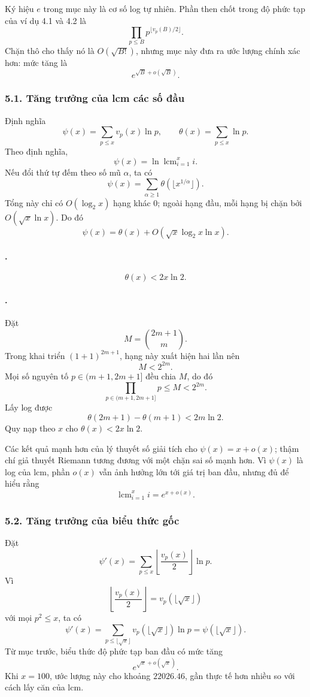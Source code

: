 \documentclass[11pt]{article}
\begin{document}
Ký hiệu \(e\) trong mục này là cơ số log tự nhiên. Phần then chốt trong độ phức
tạp của ví dụ 4.1 và 4.2 là
\[
  \prod_{p\le B}p^{\lfloor v_p(B)/2\rfloor}.
\]
Chặn thô cho thấy nó là \(O(\sqrt{B!})\), nhưng mục này đưa ra ước lượng chính
xác hơn: mức tăng là
\[
  e^{\sqrt B+o(\sqrt B)}.
\]

\subsubsection*{5.1. Tăng trưởng của lcm các số đầu}

Định nghĩa
\[
  \psi(x)=\sum_{p\le x}v_p(x)\ln p,\qquad
  \theta(x)=\sum_{p\le x}\ln p.
\]
Theo định nghĩa,
\[
  \psi(x)=\ln \operatorname{lcm}_{i=1}^{x}i.
\]
Nếu đổi thứ tự đếm theo số mũ \(\alpha\), ta có
\[
  \psi(x)=\sum_{\alpha\ge 1}\theta(\lfloor x^{1/\alpha}\rfloor).
\]
Tổng này chỉ có \(O(\log_2 x)\) hạng khác \(0\); ngoài hạng đầu, mỗi hạng bị
chặn bởi \(O(\sqrt x\ln x)\). Do đó
\[
  \psi(x)=\theta(x)+O(\sqrt x\log_2 x\ln x).
\]

\paragraph{.}
\[
  \theta(x)<2x\ln 2.
\]

\paragraph{.}
Đặt
\[
  M=\binom{2m+1}{m}.
\]
Trong khai triển \((1+1)^{2m+1}\), hạng này xuất hiện hai lần nên
\[
  M<2^{2m}.
\]
Mọi số nguyên tố \(p\in(m+1,2m+1]\) đều chia \(M\), do đó
\[
  \prod_{p\in(m+1,2m+1]}p\le M<2^{2m}.
\]
Lấy log được
\[
  \theta(2m+1)-\theta(m+1)<2m\ln 2.
\]
Quy nạp theo \(x\) cho \(\theta(x)<2x\ln 2\).

Các kết quả mạnh hơn của lý thuyết số giải tích cho
\(\psi(x)=x+o(x)\); thậm chí giả thuyết Riemann tương đương với một chặn sai
số mạnh hơn. Vì \(\psi(x)\) là log của lcm, phần \(o(x)\) vẫn ảnh hưởng lớn
tới giá trị ban đầu, nhưng đủ để hiểu rằng
\[
  \operatorname{lcm}_{i=1}^{x}i=e^{x+o(x)}.
\]

\subsubsection*{5.2. Tăng trưởng của biểu thức gốc}

Đặt
\[
  \psi'(x)=\sum_{p\le x}\left\lfloor\frac{v_p(x)}{2}\right\rfloor\ln p.
\]
Vì
\[
  \left\lfloor\frac{v_p(x)}{2}\right\rfloor
  =
  v_p(\lfloor \sqrt x\rfloor)
\]
với mọi \(p^2\le x\), ta có
\[
  \psi'(x)
  =
  \sum_{p\le \lfloor\sqrt x\rfloor}
  v_p(\lfloor\sqrt x\rfloor)\ln p
  =
  \psi(\lfloor\sqrt x\rfloor).
\]
Từ mục trước, biểu thức độ phức tạp ban đầu có mức tăng
\[
  e^{\sqrt x+o(\sqrt x)}.
\]
Khi \(x=100\), ước lượng này cho khoảng \(22026.46\), gần thực tế hơn nhiều
so với cách lấy căn của lcm.
\end{document}
